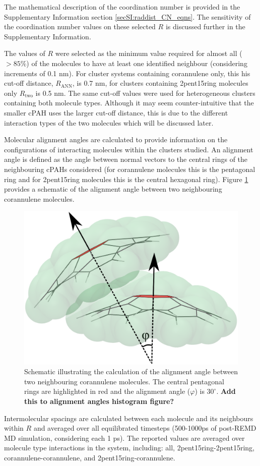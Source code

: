 The mathematical description of the coordination number is provided in the Supplementary Information section \ref{secSI:raddist_CN_eqns}.
The sensitivity of the coordination number values on these selected $R$ is discussed further in the Supplementary Information.

The values of $R$ were selected as the minimum value required for almost all ($>85\%$) of the molecules to have at least one identified neighbour (considering increments of 0.1 nm).  For cluster systems containing corannulene only, this his cut-off distance, $R_{\text{ANN}}$, is 0.7 nm, for clusters containing 2pent15ring molecules only $R_{\text{two}}$ is 0.5 nm. The same cut-off values were used for heterogeneous clusters containing both molecule types.
Although it may seem counter-intuitive that the smaller cPAH uses the larger cut-off distance, this is due to the different interaction types of the two molecules which will be discussed later.

Molecular alignment angles are calculated to provide information on the configurations of interacting molecules within the clusters studied.  An alignment angle is defined as the angle between normal vectors to the central rings of the neighbouring cPAHs considered (for corannulene molecules this is the pentagonal ring and for 2pent15ring molecules this is the central hexagonal ring).  Figure \ref{fig:alignmentangle_schematic} provides a schematic of the alignment angle between two neighbouring corannulene molecules.
%
\begin{figure}[!tbh]
\centering
\includegraphics[width=0.25\linewidth]{Figures/alignment_angle_schematic.eps}
\caption{Schematic illustrating the calculation of the alignment angle between two neighbouring corannulene molecules. The central pentagonal rings are highlighted in red and the alignment angle ($\varphi$) is $30^{\circ}$. \textbf{Add this to alignment angles histogram figure?}}
\label{fig:alignmentangle_schematic}
\end{figure}
 
Intermolecular spacings are calculated between each molecule and its neighbours within $R$ and averaged over all equilibrated timesteps (500-1000ps of post-REMD MD simulation, considering each 1 ps).  The reported values are averaged over molecule type interactions in the system, including: all, 2pent15ring-2pent15ring, corannulene-corannulene, and 2pent15ring-corannulene.

